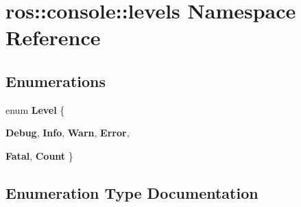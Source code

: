 \section{ros::console::levels Namespace Reference}
\label{namespaceros_1_1console_1_1levels}
\subsection*{Enumerations}
\begin{DoxyCompactItemize}
\item 
enum {\bf Level} \{ \par
{\bf Debug}, 
{\bf Info}, 
{\bf Warn}, 
{\bf Error}, 
\par
{\bf Fatal}, 
{\bf Count}
 \}
\end{DoxyCompactItemize}


\subsection{Enumeration Type Documentation}
